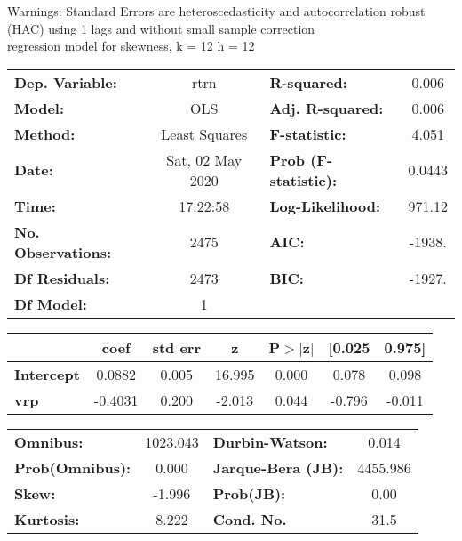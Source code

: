 Warnings: \newline
 [1] Standard Errors are heteroscedasticity and autocorrelation robust (HAC) using 1 lags and without small sample correction\\ 

regression model for skewness, k = 12 h = 12\begin{center}
\begin{tabular}{lclc}
\toprule
\textbf{Dep. Variable:}    &       rtrn       & \textbf{  R-squared:         } &     0.006   \\
\textbf{Model:}            &       OLS        & \textbf{  Adj. R-squared:    } &     0.006   \\
\textbf{Method:}           &  Least Squares   & \textbf{  F-statistic:       } &     4.051   \\
\textbf{Date:}             & Sat, 02 May 2020 & \textbf{  Prob (F-statistic):} &   0.0443    \\
\textbf{Time:}             &     17:22:58     & \textbf{  Log-Likelihood:    } &    971.12   \\
\textbf{No. Observations:} &        2475      & \textbf{  AIC:               } &    -1938.   \\
\textbf{Df Residuals:}     &        2473      & \textbf{  BIC:               } &    -1927.   \\
\textbf{Df Model:}         &           1      & \textbf{                     } &             \\
\bottomrule
\end{tabular}
\begin{tabular}{lcccccc}
                   & \textbf{coef} & \textbf{std err} & \textbf{z} & \textbf{P$> |$z$|$} & \textbf{[0.025} & \textbf{0.975]}  \\
\midrule
\textbf{Intercept} &       0.0882  &        0.005     &    16.995  &         0.000        &        0.078    &        0.098     \\
\textbf{vrp}       &      -0.4031  &        0.200     &    -2.013  &         0.044        &       -0.796    &       -0.011     \\
\bottomrule
\end{tabular}
\begin{tabular}{lclc}
\textbf{Omnibus:}       & 1023.043 & \textbf{  Durbin-Watson:     } &    0.014  \\
\textbf{Prob(Omnibus):} &   0.000  & \textbf{  Jarque-Bera (JB):  } & 4455.986  \\
\textbf{Skew:}          &  -1.996  & \textbf{  Prob(JB):          } &     0.00  \\
\textbf{Kurtosis:}      &   8.222  & \textbf{  Cond. No.          } &     31.5  \\
\bottomrule
\end{tabular}
\end{center}

